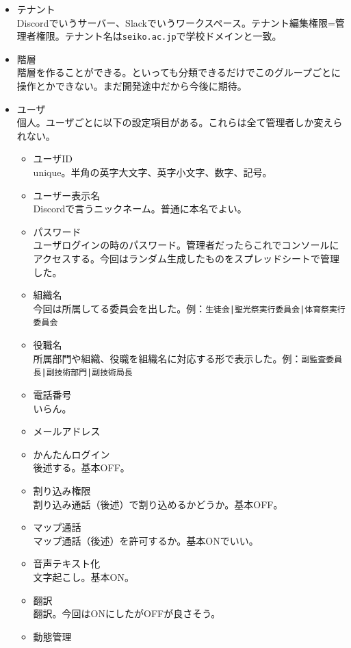 \documentclass[dvipdfmx,jb5]{jarticle}
\begin{document}
\begin{itemize}
\item テナント\\
Discordでいうサーバー、Slackでいうワークスペース。テナント編集権限=管理者権限。テナント名は\verb|seiko.ac.jp|で学校ドメインと一致。
\item 階層\\
階層を作ることができる。といっても分類できるだけでこのグループごとに操作とかできない。まだ開発途中だから今後に期待。
\item ユーザ\\
個人。ユーザごとに以下の設定項目がある。これらは全て管理者しか変えられない。
\begin{itemize}
  \item ユーザID\\
  unique。半角の英字大文字、英字小文字、数字、記号。
  \item ユーザー表示名\\
  Discordで言うニックネーム。普通に本名でよい。
  \item パスワード\\
  ユーザログインの時のパスワード。管理者だったらこれでコンソールにアクセスする。今回はランダム生成したものをスプレッドシートで管理した。
  \item 組織名\\
  今回は所属してる委員会を出した。例：\verb"生徒会|聖光祭実行委員会|体育祭実行委員会"
  \item 役職名\\
  所属部門や組織、役職を組織名に対応する形で表示した。例：\verb"副監査委員長|副技術部門|副技術局長"
  \item 電話番号\\
  いらん。
  \item メールアドレス
  \item かんたんログイン\\
  後述する。基本OFF。
  \item 割り込み権限\\
  割り込み通話（後述）で割り込めるかどうか。基本OFF。
  \item マップ通話\\
  マップ通話（後述）を許可するか。基本ONでいい。
  \item 音声テキスト化\\
  文字起こし。基本ON。
  \item 翻訳\\
  翻訳。今回はONにしたがOFFが良さそう。
  \item 動態管理\\

\end{itemize}
\end{itemize}
\end{document}
